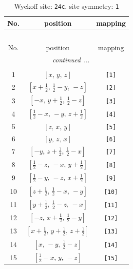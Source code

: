 \documentclass[fleqn,8pt]{jsarticle}
\begin{document}
\begin{longtable}{ccc}
\caption{Wyckoff site: {\tt 24c}, site symmetry: {\tt 1}}
 \\
 \hline \hline
No. & position & mapping \\ \hline \endfirsthead

\multicolumn{2}{l}{\tablename\ \thetable{}} \\
 \hline \hline
No. & position & mapping \\ \hline \endhead

 \hline \hline
\multicolumn{2}{r}{\footnotesize\it continued ...} \\ \endfoot

 \hline \hline
\multicolumn{2}{r}{} \\ \endlastfoot

1 & $\left[ x,\, y,\, z \right]$ & {\tt [1]} \\ \hline
2 & $\left[ x + \frac{1}{2},\, \frac{1}{2} - y,\, - z \right]$ & {\tt [2]} \\ \hline
3 & $\left[ - x,\, y + \frac{1}{2},\, \frac{1}{2} - z \right]$ & {\tt [3]} \\ \hline
4 & $\left[ \frac{1}{2} - x,\, - y,\, z + \frac{1}{2} \right]$ & {\tt [4]} \\ \hline
5 & $\left[ z,\, x,\, y \right]$ & {\tt [5]} \\ \hline
6 & $\left[ y,\, z,\, x \right]$ & {\tt [6]} \\ \hline
7 & $\left[ - y,\, z + \frac{1}{2},\, \frac{1}{2} - x \right]$ & {\tt [7]} \\ \hline
8 & $\left[ \frac{1}{2} - z,\, - x,\, y + \frac{1}{2} \right]$ & {\tt [8]} \\ \hline
9 & $\left[ \frac{1}{2} - y,\, - z,\, x + \frac{1}{2} \right]$ & {\tt [9]} \\ \hline
10 & $\left[ z + \frac{1}{2},\, \frac{1}{2} - x,\, - y \right]$ & {\tt [10]} \\ \hline
11 & $\left[ y + \frac{1}{2},\, \frac{1}{2} - z,\, - x \right]$ & {\tt [11]} \\ \hline
12 & $\left[ - z,\, x + \frac{1}{2},\, \frac{1}{2} - y \right]$ & {\tt [12]} \\ \hline
13 & $\left[ x + \frac{1}{2},\, y + \frac{1}{2},\, z + \frac{1}{2} \right]$ & {\tt [13]} \\ \hline
14 & $\left[ x,\, - y,\, \frac{1}{2} - z \right]$ & {\tt [14]} \\ \hline
15 & $\left[ \frac{1}{2} - x,\, y,\, - z \right]$ & {\tt [15]} \\ \hline

\end{longtable}
\end{document}
